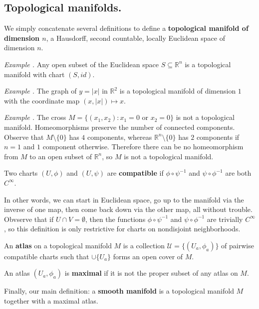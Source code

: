 \documentclass[12pt]{article}
\newcommand{\R}{\mathbb{R}}
\newenvironment{example}{\textit{Example \theexample.}}{}
\newcounter{example}
\begin{document}
\subsection{Topological manifolds.}
We simply concatenate several definitions to
define a \textbf{topological manifold of dimension $n$}, a
Hausdorff, second countable, locally Euclidean
space of dimension $n$.

\begin{example}
    Any open subset of the Euclidean space $S
    \subseteq \R^n$ is a topological manifold with
    chart $(S, id)$.
\end{example}

\begin{example}
    The graph of $y = |x|$ in $\R^2$ is a
    topological manifold of dimension $1$ with the
    coordinate map $(x, |x|) \mapsto x$.
\end{example}

\begin{example}
    The cross $M = \{(x_1,x_2): x_1 = 0$ or $x_2
    = 0\}$ is not a topological manifold.
    Homeomorphisms preserve the number of
    connected components. Observe that $M \setminus \{0\}$
    has $4$ components, whereas $\R^n \setminus \{0\}$ has
    $2$ components if $n=1$ and $1$ component
    otherwise. Therefore there can be no
    homeomorphism from $M$ to an open subset of
    $\R^n$, so $M$ is not a topological manifold.
\end{example}

Two charts $(U, \phi)$ and $(U, \psi)$ are
\textbf{compatible} if $\phi \circ \psi^{-1}$ and
$\psi \circ \phi^{-1}$ are both $C^\infty$.

\par{In other words, we can start in Euclidean
space, go up to the manifold via the inverse of
one map, then come back down via the other map,
all without trouble. Obvserve that if $U \cap V =
\emptyset$, then the functions $\phi \circ
\psi^{-1}$ and $\psi \circ \phi^{-1}$ are
trivially $C^\infty$, so this definition is only
restrictive for charts on nondisjoint
neighborhoods.}

An \textbf{atlas} on a topological manifold $M$ is a
collection $\mathcal{U} = \{(U_a, \phi_a)\}$ of
pairwise compatible charts such that $\cup
\{U_a\}$ forms an open cover of $M$.

An atlas $(U_a, \phi_a)$ is \textbf{maximal} if
it is not the proper subset of any atlas on $M$.

Finally, our main definition: a \textbf{smooth
manifold} is a topological manifold $M$ together
with a maximal atlas.
\end{document}
